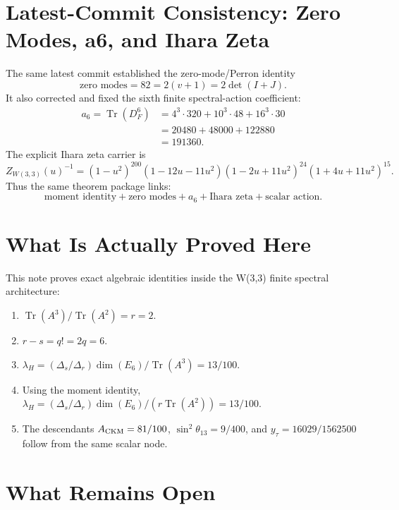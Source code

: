 \documentclass[11pt]{article}
\theoremstyle{definition}
\newcommand{\Tr}{\operatorname{Tr}}
\newcommand{\lamH}{\lambda_H}
\newcommand{\Deltar}{\Delta_r}
\newcommand{\Deltas}{\Delta_s}
\begin{document}
\section{Latest-Commit Consistency: Zero Modes, a6, and Ihara Zeta}

The same latest commit established the zero-mode/Perron identity
\[
  \text{zero modes}=82=2(v+1)=2\det(I+J).
\]
It also corrected and fixed the sixth finite spectral-action coefficient:
\[
\begin{aligned}
  a_6=\Tr(D_F^6)
  &=4^3\cdot320+10^3\cdot48+16^3\cdot30 \\
  &=20480+48000+122880 \\
  &=191360.
\end{aligned}
\]
The explicit Ihara zeta carrier is
\[
Z_{W(3,3)}(u)^{-1}=(1-u^2)^{200}(1-12u-11u^2)(1-2u+11u^2)^{24}(1+4u+11u^2)^{15}.
\]
Thus the same theorem package links:
\[
\text{moment identity} + \text{zero modes} + a_6 + \text{Ihara zeta} + \text{scalar action}.
\]

\section{What Is Actually Proved Here}

This note proves exact algebraic identities inside the W(3,3) finite spectral architecture:
\begin{enumerate}[leftmargin=2em]
  \item \(\Tr(A^3)/\Tr(A^2)=r=2\).
  \item \(r-s=q!=2q=6\).
  \item \(\lamH=(\Deltas/\Deltar)\dim(E_6)/\Tr(A^3)=13/100\).
  \item Using the moment identity, \(\lamH=(\Deltas/\Deltar)\dim(E_6)/(r\Tr(A^2))=13/100\).
  \item The descendants \(A_{\rm CKM}=81/100\), \(\sin^2\theta_{13}=9/400\), and \(y_\tau=16029/1562500\) follow from the same scalar node.
\end{enumerate}

\section{What Remains Open}
\end{document}
